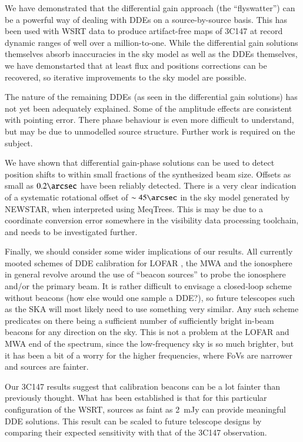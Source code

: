 \documentclass[]{aa}
\begin{document}
We have demonstrated that the differential gain approach (the ``flyswatter'') can be a powerful way of dealing with DDEs on a source-by-source basis. This has been used with WSRT data to produce artifact-free maps of 3C147 at record dynamic ranges of well over a million-to-one. While the differential gain solutions themselves absorb inaccuracies in the sky model as well as the DDEs themselves, we have demonstarted that at least flux and positions corrections can be recovered, so iterative improvements to the sky model are possible.

The nature of the remaining DDEs (as seen in the differential gain solutions) has not yet been adequately explained. Some of the amplitude effects are consistent with pointing error. There phase behaviour is even more difficult to understand, but may be due to unmodelled source structure. Further work is required on the subject. 

We have shown that differential gain-phase solutions can be used to detect position shifts to within small fractions of the synthesized beam size. Offsets as small as $0.2\arcsec$ have been reliably detected. There is a very clear indication of a systematic rotational offset of $\sim45\arcsec$ in the sky model generated by NEWSTAR, when interpreted using MeqTrees. This is may be due to a coordinate conversion error somewhere in the visibility data processing toolchain, and needs to be investigated further.

Finally, we should consider some wider implications of our results. All currently mooted schemes of DDE calibration for LOFAR \citep{JEN:LOFAR3}, the MWA \citep{Mitchell:MWA-cal} and the ionosphere in general \citep{Intema:SPAM,Cotton:FBC} revolve around the use of ``beacon sources'' to probe the ionosphere and/or the primary beam. It is rather difficult to envisage a closed-loop scheme without beacons (how else would one sample a DDE?), so future telescopes such as the SKA will most likely need to use something very similar. Any such scheme predicates on there being a sufficient number of sufficiently bright in-beam beacons for any direction on the sky. This is not a problem at the LOFAR and MWA end of the spectrum, since the low-frequency sky is so much brighter, but it has been a bit of a worry for the higher frequencies, where FoVs are narrower and sources are fainter.

Our 3C147 results suggest that calibration beacons can be a lot fainter than previously thought. What has been established is that for this particular configuration of the WSRT, sources as faint as 2~mJy can provide meaningful DDE solutions. This result can be scaled to future telescope designs by comparing their expected sensitivity with that of the 3C147 observation.




\end{document}
